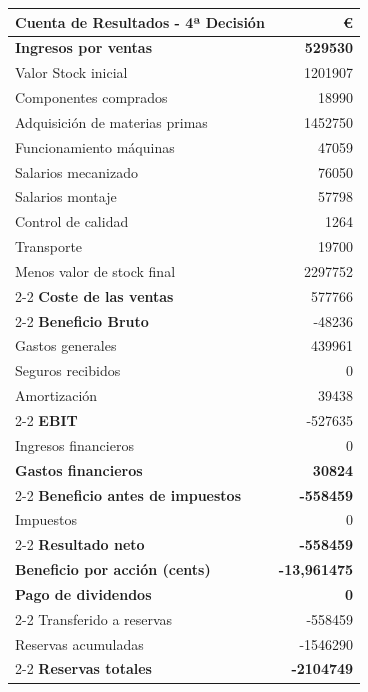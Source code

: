 \begin{table}[h]
    \centering
    \begin{tabular}{lr}
        \textbf{Cuenta de Resultados - 4ª Decisión} & \textbf{€} \\
        \hline
        \textbf{Ingresos por ventas}                & \textbf{529530} \\
        Valor Stock inicial                         & 1201907 \\
        Componentes comprados                       & 18990 \\
        Adquisición de materias primas              & 1452750 \\
        Funcionamiento máquinas                     & 47059 \\
        Salarios mecanizado                         & 76050 \\
        Salarios montaje                            & 57798 \\
        Control de calidad                          & 1264 \\
        Transporte                                  & 19700 \\
        Menos valor de stock final                  & 2297752 \\
        \cline{2-2}
        \textbf{Coste de las ventas}                & 577766 \\
        \cline{2-2}
        \textbf{Beneficio Bruto}                    & -48236 \\
        Gastos generales                            & 439961 \\
        Seguros recibidos                           & 0 \\
        Amortización                                & 39438 \\
        \cline{2-2}
        \textbf{EBIT}                               & -527635 \\
        Ingresos financieros                        & 0 \\
        \textbf{Gastos financieros}                 & \textbf{30824} \\
        \cline{2-2}
        \textbf{Beneficio antes de impuestos}       & \textbf{-558459} \\
        Impuestos                                   & 0 \\
        \cline{2-2}
        \textbf{Resultado neto}                     & \textbf{-558459} \\
        \textbf{Beneficio por acción (cents)}       & \textbf{-13,961475} \\
        \textbf{Pago de dividendos}                 & \textbf{0} \\
        \cline{2-2}
        Transferido a reservas                      & -558459 \\
        Reservas acumuladas                         & -1546290 \\
        \cline{2-2}
        \textbf{Reservas totales}                   & \textbf{-2104749}
    \end{tabular}
\end{table}

